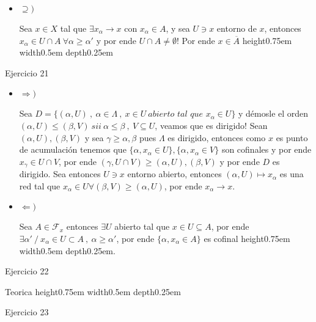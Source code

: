 \documentclass[11pt]{article}
\newcommand{\sett}[1]{\{#1\}}
\newenvironment{proof}[1][Demostraci\'on]{\begin{trivlist}
\item[\hskip \labelsep {\bfseries #1}]}{\end{trivlist}}
\newcommand{\qed}{\nobreak \ifvmode \relax \else
      \ifdim\lastskip<1.5em \hskip-\lastskip
      \hskip1.5em plus0em minus0.5em \fi \nobreak
      \vrule height0.75em width0.5em depth0.25em\fi}
\begin{document}
\begin{enumerate}
\begin{proof}
\begin{itemize}
\item {$\supseteq)$}

Sea $x \in X$ tal que $\exists x_{\alpha} \rightarrow x$ con $x_{\alpha} \in A$, y sea $U \ni x$ entorno de $x$, entonces $x_{\alpha} \in U \cap A \ \forall \alpha \geq \alpha'$ y por ende $U \cap A \neq \emptyset$! Por ende $x \in \overline{A}$ \qed


\end{itemize}

\end{proof}

\item {Ejercicio 21}

\begin{proof}
\begin{itemize}
\item {$\Longrightarrow)$}

Sea $D = \sett{(\alpha,U) \ , \ \alpha \in \Lambda \ , \ x \in U \ \textit{abierto tal que } x_{\alpha} \in U}$ y d\'emosle el orden $(\alpha,U) \leq (\beta,V) \ sii \ \alpha \leq \beta \ , \ V \subseteq U$, veamos que es dirigido! Sean $(\alpha,U),(\beta,V)$ y sea $\gamma \geq \alpha,\beta$ pues $\Lambda$ es dirigido, entonces como $x$ es punto de acumulaci\'on tenemos que $\sett{\alpha , x_{\alpha} \in U},\sett{\alpha, x_{\alpha} \in V}$ son cofinales y por ende $x_{\gamma} \in U \cap V$, por ende $(\gamma,U \cap V) \geq (\alpha,U),(\beta,V)$ y por ende $D$ es dirigido. Sea entonces $U \ni x$ entorno abierto, entonces $(\alpha,U) \mapsto x_{\alpha}$ es una red tal que $x_{\alpha} \in U \forall (\beta,V) \geq (\alpha,U)$, por ende $x_{\alpha} \rightarrow x$.

\item{$\Longleftarrow)$}

Sea $A \in \mathcal{F}_x$ entonces $\exists U$ abierto tal que $x \in U \subseteq A$, por ende $\exists \alpha' \ / \ x_{\alpha} \in U \subset A \ , \ \alpha \geq \alpha'$, por ende $\sett{\alpha , x_{\alpha} \in A}$ es cofinal \qed.

\end{itemize}
\end{proof}

\item {Ejercicio 22}

\begin{proof}
Teorica \qed
\end{proof}

\item {Ejercicio 23}


\end{enumerate}
\end{document}
